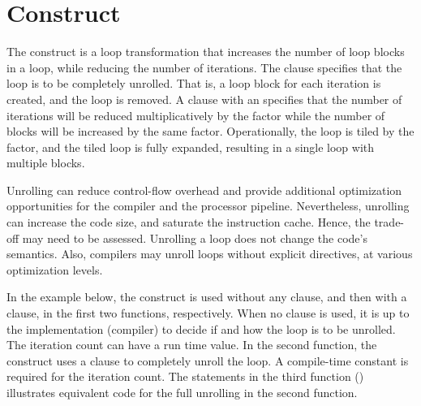 \section{ Construct}
\label{sec:unroll}

The  construct is a loop transformation that increases the 
number of loop blocks in a loop, while reducing the number of iterations.
The  clause specifies that the loop is to be completely unrolled.  
That is, a loop block for each iteration is created, and the loop is removed.
A  clause  with an  specifies that the number of
iterations will be reduced multiplicatively by the factor while the number of 
blocks will be increased by the same factor.  
Operationally, the loop is tiled by the factor, and the tiled loop is 
fully expanded, resulting in a single loop with multiple blocks.

Unrolling can reduce control-flow overhead and provide additional
optimization opportunities for the compiler and the processor
pipeline. Nevertheless, unrolling can increase the code size, and saturate
the instruction cache. Hence, the trade-off may need to be assessed.
Unrolling a loop does not change the code's semantics. Also, compilers
may unroll loops without explicit directives, at various optimization levels.

In the example below, the  construct is used without any clause, and then
with a  clause, in the first two functions, respectively.
When no clause is used, it is up to the implementation (compiler) 
to decide if and how the loop is to be unrolled.  
The iteration count can have a run time value.  
In the second function, the  construct uses a  clause
to completely unroll the loop.  A compile-time constant is required for the iteration count.
The statements in the third function () illustrates
equivalent code for the full unrolling in the second function.



